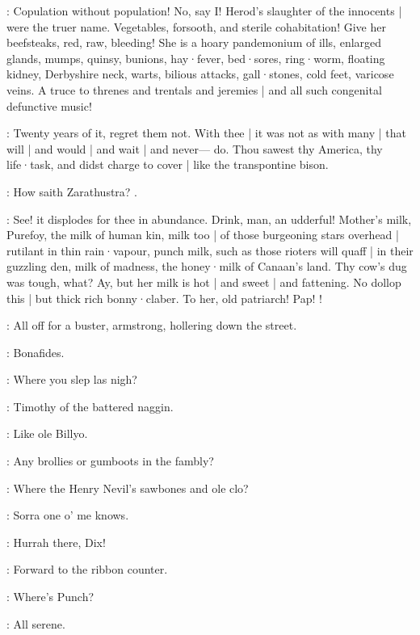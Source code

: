 :
Copulation without population!
No,
say I!
Herod's slaughter of the innocents |
were the truer name.
Vegetables,
forsooth,
and sterile cohabitation!
Give her beefsteaks,
red,
raw,
bleeding!
She is a hoary pandemonium of ills,
enlarged glands,
mumps,
quinsy,
bunions,
hay·fever,
bed·sores,
ring·worm,
floating kidney,
Derbyshire neck,
warts,
bilious attacks,
gall·stones,
cold feet,
varicose veins.
A truce to threnes and trentals and jeremies |
and all such congenital defunctive music!

:
Twenty years of it,
regret them not.
With thee |
it was not as with many |
that will |
and would |
and wait |
and never---%
do.
Thou sawest thy America,
thy life·task,
and didst charge to cover |
like the transpontine bison.

:
How saith Zarathustra?
.

:
See!
it displodes for thee in abundance.
Drink,
man,
an udderful!
Mother's milk,
Purefoy,
the milk of human kin,
milk too |
of those burgeoning stars overhead |
rutilant in thin rain·vapour,
punch milk,
such as those rioters will quaff |
in their guzzling den,
milk of madness,
the honey·milk of Canaan's land.
Thy cow's dug was tough,
what?
Ay,
but her milk is hot |
and sweet |
and fattening.
No dollop this |
but thick rich bonny·claber.
To her,
old patriarch!
Pap!
!



:
All off for a buster,
armstrong,
hollering down the street.

\dixon:
Bonafides.

\lynch:
Where you slep las nigh?

\crotthers:
Timothy of the battered naggin.

\stephen:
Like ole Billyo.

\punch:
Any brollies or gumboots in the fambly?

\lenehan:
Where the Henry Nevil's sawbones and ole clo?

\mulligan:
Sorra one o' me knows.

\madden:
Hurrah there,
Dix!

:
Forward to the ribbon counter.

\dixon:
Where's Punch?

:
All serene.


